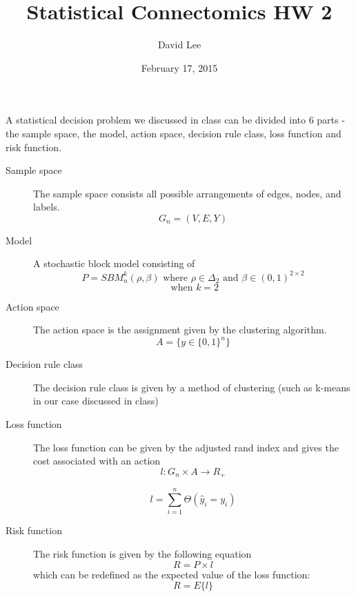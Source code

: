 \documentclass{article}
\title{Statistical Connectomics HW 2}
\author{David Lee}
\date{February 17, 2015}
\begin{document}
\maketitle

A statistical decision problem we discussed in class can be divided into 6 parts - the sample space, the model, action space, decision rule class, loss function and risk function.

\begin{description}
\item[Sample space]
The sample space consists all possible arrangements of edges, nodes, and labels.
\begin{equation}
G_n=(V,E,Y)
\end{equation}

\item[Model]
A stochastic block model consisting of 
\begin{equation}
P=SBM_n^k(\rho,\beta)\textrm{ where }\rho\in\Delta_2\textrm{ and }\beta\in(0,1)^{2\times2}
\end{equation}
\begin{equation*}
\textrm{ when } k =2
\end{equation*}

\item[Action space]
The action space is the assignment given by the clustering algorithm.
\begin{equation}
A=\{y\in\{0,1\}^n\}
\end{equation}

\item[Decision rule class]
The decision rule class is given by a method of clustering (such as k-means in our case discussed in class)

\item[Loss function]
The loss function can be given by the adjusted rand index and gives the cost associated with an action
\begin{equation}
l:G_n\times A\to R_+
\end{equation}

\begin{equation*}
l=\sum_{i=1}^n\Theta(\hat{y}_i=y_i)
\end{equation*}

\item[Risk function]
The risk function is given by the following equation
\begin{equation}
R=P\times l
\end{equation}which can be redefined as the expected value of the loss function:
\begin{equation}
	R=E\{l\}
\end{equation}
\end{description}
\end{document}
